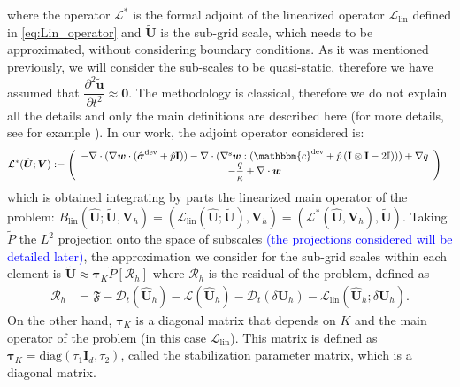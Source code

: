 \documentclass[11pt,english]{article}
\newcommand{\LM}[1]{\textcolor{blue}{#1}}
\def\disp{\boldsymbol{u}}
\def\disptest{\boldsymbol{w}}
\def\stress{\boldsymbol{\sigma}}
\def\Identity{\mathbf{I}}
\def\TestFunctions{\boldsymbol{V}}
\def\UnkVariables{\boldsymbol{U}}
\def\DerB{B_{\text{lin}}}
\def\D{\mathcal{D}}
\def\L{\mathcal{L}}
\def\DerL{\mathcal{L}_{\text{lin}}}
\begin{document}
    where the operator $ \mathcal{L}^*$ is the formal adjoint of the linearized operator $\DerL$ defined in \eqref{eq:Lin_operator} and $\tilde{\UnkVariables}$ is the sub-grid scale, which needs to be approximated, without considering boundary conditions. As it was mentioned previously,  we will consider the sub-scales to be quasi-static, therefore we have assumed that $\dfrac{\partial^2 \tilde{\disp}}{\partial t^2} \approx \boldsymbol{0}$. The methodology is classical, therefore we do not explain all the details and only the main definitions are described here (for more details, see for example \cite{castanar2020stabilized}).
    In our work, the adjoint operator considered is:
    \begin{align}
        &\mathcal{L}^*(\hat{\UnkVariables};\TestFunctions):=
        \left(\begin{array}{c}
         -\nabla \cdot (\nabla \disptest \cdot( \hat{\stress}^{\text{dev}}+\hat{p}\Identity ))-\nabla \cdot (\nabla^{\rm{s}} \disptest: (\mathbbm{c}^{\text{dev}}+\hat{p}\left( \Identity \otimes \Identity -2\mathbb{I}))\right) + \nabla q
         \\
        - \dfrac{q}{\kappa} + \nabla \cdot \disptest 
        \end{array}\right)%
    \end{align}
which is obtained integrating by parts the linearized main operator of the problem:  
$\DerB(\hat{\UnkVariables}; \tilde{\UnkVariables},\TestFunctions_h) =  (\DerL(\hat{\UnkVariables};\tilde{\UnkVariables}),\TestFunctions_h)=(\mathcal{L}^*(\hat{\UnkVariables},\TestFunctions_h),\tilde{\UnkVariables}).$  Taking  $\tilde{P}$ the $L^2$ projection onto the space of subscales \LM{(the projections considered will be detailed later)}, the approximation we consider for the sub-grid scales within each element is $ \tilde{\UnkVariables} \approx \boldsymbol{\tau}_K\tilde{P}\left[ \mathcal{R}_h\right] $ where $\mathcal{R}_h$ is the residual of the problem, defined as 
    \begin{align*}
        \mathcal{R}_h&=\mathfrak{F}-\D_t(\hat{\UnkVariables}_h)-\L(\hat{\UnkVariables}_h)-\D_t\left(\delta\UnkVariables_h\right)-\DerL(\hat{\UnkVariables}_h;\delta\UnkVariables_h).
    \end{align*}
    On the other hand, $\boldsymbol{\tau}_K$ is a diagonal matrix that depends on $K$ and the main operator of the problem (in this case $\mathcal{L}_{\text{lin}}$).  
    This matrix is defined as $\boldsymbol{\tau}_K=\text{diag}(\tau_1 \Identity_d ,\tau_2)$, called the stabilization parameter matrix, which is a diagonal matrix. 
\end{document}
